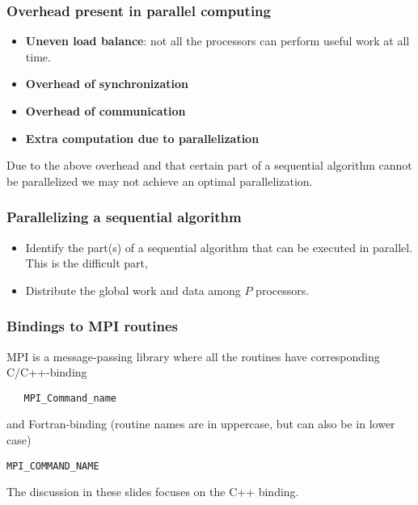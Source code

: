 \documentclass{beamer}
\begin{document}
\begin{frame}
\frametitle{Overhead present in parallel computing}

\begin{block}{}

\begin{itemize}
\item \textbf{Uneven load balance}:  not all the processors can perform useful work at all time.

\item \textbf{Overhead of synchronization}

\item \textbf{Overhead of communication}

\item \textbf{Extra computation due to parallelization}
\end{itemize}

\noindent
Due to the above overhead and that certain part of a sequential
algorithm cannot be parallelized we may not achieve an optimal parallelization.
\end{block}
\end{frame}

\begin{frame}
\frametitle{Parallelizing a sequential algorithm}

\begin{block}{}

\begin{itemize}
\item Identify the part(s) of a sequential algorithm that can be  executed in parallel. This is the difficult part,

\item Distribute the global work and data among $P$ processors.
\end{itemize}

\noindent
\end{block}
\end{frame}

\begin{frame}
\frametitle{Bindings to MPI routines}

\begin{block}{}


MPI is a message-passing library where all the routines
have corresponding C/C++-binding
\begin{verbatim}
   MPI_Command_name
\end{verbatim}
and Fortran-binding (routine names are in uppercase, but can also be in lower case)
\begin{Verbatim}[numbers=none,fontsize=\fontsize{9pt}{9pt},baselinestretch=0.95]
   MPI_COMMAND_NAME
\end{Verbatim}
The discussion in these slides focuses on the C++ binding.

\end{block}
\end{frame}
\end{document}
